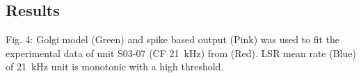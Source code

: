\documentclass{article}
\begin{document}


\subsection{Results}
Fig. 4: Golgi model (Green) and spike based output (Pink) was used to
fit the experimental data of unit S03-07 (CF 21~kHz) from
\citep{GhoshalKim:1996} (Red).  LSR mean rate (Blue) of 21~kHz unit is
monotonic with a high threshold.

\begin{figure}[htb]
  \centering
\end{figure}
\end{document}
